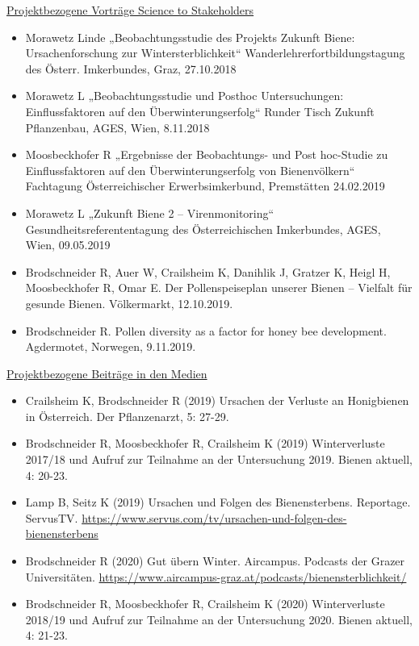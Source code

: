 \underline{Projektbezogene Vorträge Science to Stakeholders}

\begin{itemize}
    \item 
    Morawetz Linde „Beobachtungsstudie des Projekts Zukunft Biene: Ursachenforschung zur Wintersterblichkeit“ Wanderlehrerfortbildungstagung des Österr. Imkerbundes, Graz, 27.10.2018

    \item 
    Morawetz L „Beobachtungsstudie und Posthoc Untersuchungen: Einflussfaktoren auf den Überwinterungserfolg“ Runder Tisch Zukunft Pflanzenbau, AGES, Wien, 8.11.2018

    \item 
    Moosbeckhofer R „Ergebnisse der Beobachtungs- und Post hoc-Studie zu Einflussfaktoren auf den Überwinterungserfolg von Bienenvölkern“ Fachtagung Österreichischer Erwerbsimkerbund, Premstätten 24.02.2019

    \item 
    Morawetz L „Zukunft Biene 2 – Virenmonitoring“ Gesundheitsreferententagung des Österreichischen Imkerbundes, AGES, Wien, 09.05.2019
    
    \item 
    Brodschneider R, Auer W, Crailsheim K, Danihlik J, Gratzer K, Heigl H, Moosbeckhofer R, Omar E. Der Pollenspeiseplan unserer Bienen – Vielfalt für gesunde Bienen. Völkermarkt, 12.10.2019.
    
    \item 
    Brodschneider R. Pollen diversity as a factor for honey bee development. Agdermotet, Norwegen, 9.11.2019.


\end{itemize}

\underline{Projektbezogene Beiträge in den Medien}

\begin{itemize}

    \item
    Crailsheim K, Brodschneider R (2019) Ursachen der Verluste an Honigbienen in Österreich. Der Pflanzenarzt, 5: 27-29.

    \item
    Brodschneider R, Moosbeckhofer R, Crailsheim K (2019) Winterverluste 2017/18 und Aufruf zur Teilnahme an der Untersuchung 2019. Bienen aktuell, 4: 20-23.

    \item
    Lamp B, Seitz K (2019) Ursachen und Folgen des Bienensterbens. Reportage. ServusTV. \url{https://www.servus.com/tv/ursachen-und-folgen-des-bienensterbens}
    
    \item
    Brodschneider R (2020) Gut übern Winter. Aircampus. Podcasts der Grazer Universitäten. \url{https://www.aircampus-graz.at/podcasts/bienensterblichkeit/}
    
    \item
    Brodschneider R, Moosbeckhofer R, Crailsheim K (2020) Winterverluste 2018/19 und Aufruf zur Teilnahme an der Untersuchung 2020. Bienen aktuell, 4: 21-23.

\end{itemize}

